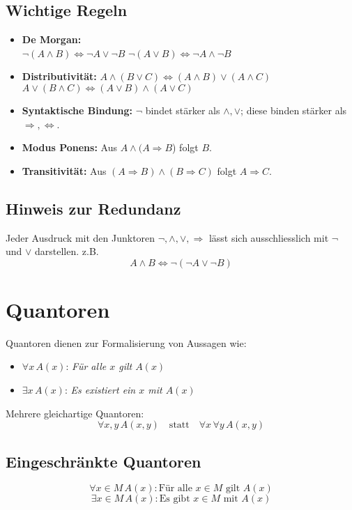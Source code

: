 \documentclass[10pt,landscape]{article}
\begin{document}
\begin{multicols*}{4}
\subsection{Wichtige Regeln}
\begin{itemize}
  \item \textbf{De Morgan:}\\ 
    \(\lnot(A\land B)\Leftrightarrow \lnot A\lor\lnot B\) 
    \(\lnot(A\lor B)\Leftrightarrow\lnot A\land\lnot B\)
  \item \textbf{Distributivität:}
    \(A\land(B\lor C)\Leftrightarrow (A\land B)\lor(A\land C)\)
    \(A\lor(B\land C)\Leftrightarrow (A\lor B)\land(A\lor C)\)
  \item \textbf{Syntaktische Bindung:} \(\lnot\) bindet stärker als \(\land,\lor\); diese binden stärker als \(\Rightarrow,\Leftrightarrow\).
  \item \textbf{Modus Ponens:} Aus \(A \land (A\Rightarrow B\)) folgt \(B\).
  \item \textbf{Transitivität:} Aus \((A\Rightarrow B) \land (B\Rightarrow C)\) folgt \(A\Rightarrow C\).
\end{itemize}

\subsection{Hinweis zur Redundanz}
Jeder Ausdruck mit den Junktoren $\lnot,\land,\lor,\Rightarrow$ lässt sich ausschliesslich mit \(\lnot\) und \(\lor\) darstellen. z.B.
$$A\land B \Leftrightarrow \lnot(\lnot A\lor\lnot B)$$

\section{Quantoren}
Quantoren dienen zur Formalisierung von Aussagen wie:
\begin{itemize}
  \item $\forall x\,A(x)$: \emph{Für alle $x$ gilt $A(x)$}
  \item $\exists x\,A(x)$: \emph{Es existiert ein $x$ mit $A(x)$}
\end{itemize}

Mehrere gleichartige Quantoren:
$$\forall x,y\,A(x,y) \quad\text{statt}\quad \forall x\,\forall y\,A(x,y)$$


\subsection{Eingeschränkte Quantoren}
$$\forall x \in M\,A(x): \text{Für alle }x\in M \text{ gilt }A(x)$$
$$\exists x \in M\,A(x): \text{Es gibt }x\in M \text{ mit }A(x)$$


\end{multicols*}
\end{document}
